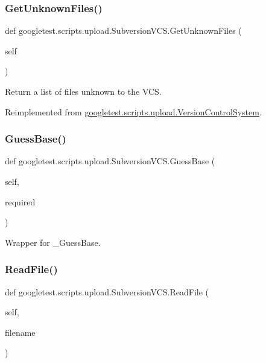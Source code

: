 \subsubsection{\texorpdfstring{GetUnknownFiles()}{GetUnknownFiles()}}
{\footnotesize\ttfamily def googletest.\+scripts.\+upload.\+Subversion\+V\+C\+S.\+Get\+Unknown\+Files (\begin{DoxyParamCaption}\item[{}]{self }\end{DoxyParamCaption})}

\begin{DoxyVerb}Return a list of files unknown to the VCS.\end{DoxyVerb}
 

Reimplemented from \mbox{\hyperlink{classgoogletest_1_1scripts_1_1upload_1_1_version_control_system_a65c6bfa5a25cadeaa54866c6d3cf9da3}{googletest.\+scripts.\+upload.\+Version\+Control\+System}}.

\mbox{\label{classgoogletest_1_1scripts_1_1upload_1_1_subversion_v_c_s_a6f90129a574e7f74c77dfc24d9693203}} 
\subsubsection{\texorpdfstring{GuessBase()}{GuessBase()}}
{\footnotesize\ttfamily def googletest.\+scripts.\+upload.\+Subversion\+V\+C\+S.\+Guess\+Base (\begin{DoxyParamCaption}\item[{}]{self,  }\item[{}]{required }\end{DoxyParamCaption})}

\begin{DoxyVerb}Wrapper for _GuessBase.\end{DoxyVerb}
 \mbox{\label{classgoogletest_1_1scripts_1_1upload_1_1_subversion_v_c_s_ada3f1518757ec50d4736a45e7b8a9f8d}} 
\subsubsection{\texorpdfstring{ReadFile()}{ReadFile()}}
{\footnotesize\ttfamily def googletest.\+scripts.\+upload.\+Subversion\+V\+C\+S.\+Read\+File (\begin{DoxyParamCaption}\item[{}]{self,  }\item[{}]{filename }\end{DoxyParamCaption})}

